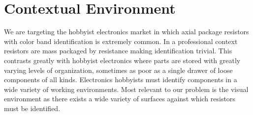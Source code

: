 \documentclass{article}
\begin{document}
\section{Contextual Environment}

We are targeting the hobbyist electronics market in which axial package resistors with color band identification is extremely common. 
In a professional context resistors are mass packaged by resistance making identification trivial. 
This contrasts greatly with hobbyist electronics where parts are stored with greatly varying levels of organization, sometimes as poor as a single drawer of loose components of all kinds.
Electronics hobbyists must identify components in a wide variety of working environments. 
Most relevant to our problem is the visual environment as there exists a wide variety of surfaces against which resistors must be identified.
\end{document}
